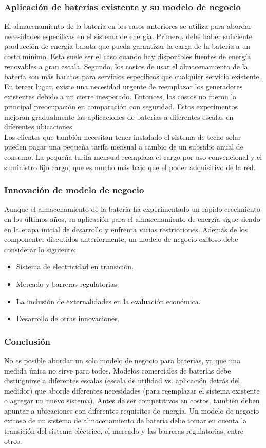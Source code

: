 \documentclass[10pt]{beamer}
\begin{document}
\begin{frame}
\frametitle{Aplicación de baterías existente y su modelo de negocio}
El almacenamiento de la batería en los casos anteriores se utiliza para abordar necesidades específicas en el sistema de energía. Primero, debe haber suficiente producción de energía barata que pueda garantizar la carga de la batería a un costo mínimo. Esta suele ser el caso cuando hay disponibles fuentes de energía renovables a gran escala. Segundo, los costos de usar el  almacenamiento de la batería son más baratos para servicios específicos que cualquier servicio existente. En tercer lugar, existe una necesidad urgente de reemplazar los generadores existentes debido a un cierre inesperado. Entonces, los costos no fueron la principal preocupación en comparación con seguridad. Estos experimentos mejoran gradualmente las aplicaciones de baterías a diferentes escalas en diferentes ubicaciones.\\
Los clientes que también necesitan tener instalado el sistema de techo solar pueden pagar una pequeña tarifa mensual a cambio de un subsidio anual de consumo. La pequeña tarifa mensual reemplaza el cargo por uso convencional y el suministro fijo cargo, que es mucho más bajo que el poder adquisitivo de la red.
\end{frame}
\begin{frame}
\frametitle{Innovación de modelo de negocio}
Aunque el almacenamiento de la batería ha experimentado un rápido crecimiento en los últimos años, su aplicación para el almacenamiento de energía sigue siendo en la etapa inicial de desarrollo y enfrenta varias restricciones. Además de los componentes discutidos anteriormente, un modelo de negocio exitoso debe considerar lo siguiente:
\begin{itemize}
\item Sistema de electricidad en transición.
\item Mercado y barreras regulatorias.
\item La inclusión de externalidades en la evaluación económica.
\item Desarrollo de otras innovaciones.
\end{itemize}
\end{frame}
\begin{frame}
\frametitle{Conclusión}
No es posible abordar un solo modelo de negocio para baterías, ya que una medida única no sirve para todos. Modelos comerciales de baterías
debe distinguirse a diferentes escalas (escala de utilidad vs. aplicación detrás del medidor) que aborde diferentes necesidades
(para reemplazar el sistema existente o agregar un nuevo sistema). Antes de ser competitivos en costos, también deben apuntar a
ubicaciones con diferentes requisitos de energía. Un modelo de negocio exitoso de un sistema de almacenamiento de batería debe tomar
en cuenta la transición del sistema eléctrico, el mercado y las barreras regulatorias, entre otros.
\end{frame}
\end{document}
